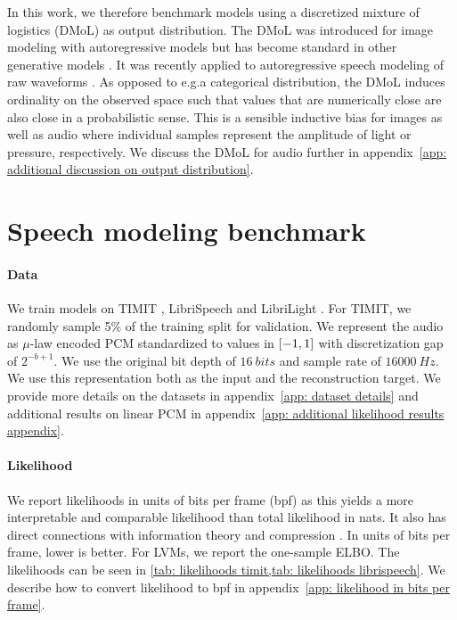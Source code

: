 {In this work, we therefore benchmark models using a discretized mixture of logistics (DMoL) as output distribution. The DMoL was introduced for image modeling with autoregressive models \parencite{salimans_pixelcnn_2017} but has become standard in other generative models \parencite{maaloe_biva_2019, vahdat_nvae_2020, child_very_2021}. 
It was recently applied to autoregressive speech modeling of raw waveforms \parencite{oord_parallel_2018}. 
As opposed to e.g.\@ a categorical distribution, the DMoL induces ordinality on the observed space such that values that are numerically close are also close in a probabilistic sense. This is a sensible inductive bias for images as well as audio where individual samples represent the amplitude of light or pressure, respectively. We discuss the DMoL for audio further in appendix~\cref{app: additional discussion on output distribution}.


\section{Speech modeling benchmark}\label{sec:glvm_benchmark}
\paragraph{Data}
We train models on TIMIT \parencite{garofolo_timit_1993}, LibriSpeech \parencite{panayotov_librispeech_2015} and LibriLight \parencite{kahn_libri-light_2020}. For TIMIT, we randomly sample 5\% of the training split for validation. 
We represent the audio as $\mu$-law encoded PCM standardized to values in ${\left[-1, 1\right]}$ with discretization gap of ${2^{-b+1}}$. We use the original bit depth of $\SI{16}{bits}$ and sample rate of $\SI{16000}{Hz}$. We use this representation both as the input and the reconstruction target. We provide more details on the datasets in appendix~\cref{app: dataset details} and additional results on linear PCM in appendix~\cref{app: additional likelihood results appendix}.
%
\paragraph{Likelihood}
We report likelihoods in units of bits per frame (bpf) as this yields a more interpretable and comparable likelihood than total likelihood in nats. It also has direct connections with information theory and compression \parencite{shannon_mathematical_1948, townsend_practical_2019}. In units of bits per frame, lower is better. For LVMs, we report the one-sample ELBO. The likelihoods can be seen in \cref{tab: likelihoods timit,tab: likelihoods librispeech}. We describe how to convert likelihood to bpf in appendix~\cref{app: likelihood in bits per frame}.
%
}

